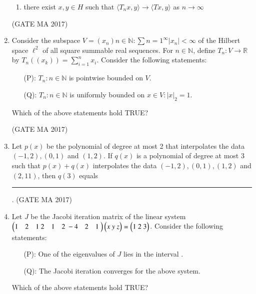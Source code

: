 \documentclass[journal,12pt,onecolumn]{IEEEtran}
\theoremstyle{remark}
\begin{document}
\begin{enumerate}
\begin{enumerate}
\item there exist $x, y \in H$ such that $\langle T_n x, y \rangle \to \langle Tx, y \rangle$ as $n \to \infty$
\end{enumerate}
\hfill (GATE MA 2017)
\item
Consider the subspace $V = {(x_n){n \in \mathbb{N}} : \sum{n=1}^\infty |x_n| < \infty }$ of the Hilbert space $\ell^2$ of all square summable real sequences. For $n \in \mathbb{N}$, define $T_n: V \to \mathbb{R}$ by $T_n((x_k)) = \sum_{i=1}^n x_i$. Consider the following statements:
\begin{itemize}
\item[(P):] ${T_n : n \in \mathbb{N}}$ is pointwise bounded on $V$.
\item[(Q):] ${T_n : n \in \mathbb{N}}$ is uniformly bounded on ${x \in V : |x|_2 = 1}$.
\end{itemize}
Which of the above statements hold TRUE?
\begin{enumerate}
\end{enumerate}
\hfill (GATE MA 2017)
\item
Let $p(x)$ be the polynomial of degree at most 2 that interpolates the data $(-1,2), (0,1)$ and $(1,2)$. If $q(x)$ is a polynomial of degree at most 3 such that $p(x)+q(x)$ interpolates the data $(-1,2), (0,1), (1,2)$ and $(2,11)$, then $q(3)$ equals \rule{1.5cm}{0.4pt}.
\hfill (GATE MA 2017)
\item
Let $J$ be the Jacobi iteration matrix of the linear system
$\begin{pmatrix} 1 & 2 & 1 \ 2 & 1 & 2 \ -4 & 2 & 1 \ \end{pmatrix} \begin{pmatrix} x \ y \ z \end{pmatrix} = \begin{pmatrix} 1 \ 2 \ 3 \end{pmatrix}$.
Consider the following statements:
\begin{itemize}
\item[(P):] One of the eigenvalues of $J$ lies in the interval .
\item[(Q):] The Jacobi iteration converges for the above system.
\end{itemize}
Which of the above statements hold TRUE?
\begin{enumerate}
\end{enumerate}
\end{enumerate}
\end{document}
